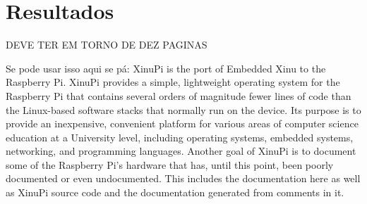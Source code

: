 \section{Resultados}
\label{seq:resultados}

DEVE TER EM TORNO DE DEZ PAGINAS


Se pode usar isso aqui se pá: XinuPi is the port of Embedded Xinu to the Raspberry Pi. XinuPi provides a simple, lightweight operating system for the Raspberry Pi that contains several orders of magnitude fewer lines of code than the Linux-based software stacks that normally run on the device. Its purpose is to provide an inexpensive, convenient platform for various areas of computer science education at a University level, including operating systems, embedded systems, networking, and programming languages. Another goal of XinuPi is to document some of the Raspberry Pi’s hardware that has, until this point, been poorly documented or even undocumented. This includes the documentation here as well as XinuPi source code and the documentation generated from comments in it.

